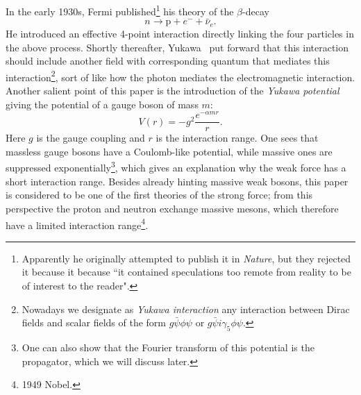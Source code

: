 In the early 1930s, Fermi published\footnote{Apparently he originally attempted
to publish it in {\it Nature}, but they rejected it because
it because ``it contained speculations too remote from reality to be of interest
to the reader".} his theory of the 
$\beta$-decay~\cite{fermi_tentativo_1934}
\begin{equation}
  n\to\text{p}+e^-+\bar{\nu}_e.
\end{equation}
He introduced an effective 4-point interaction directly linking the four
particles in the above process.
Shortly thereafter, Yukawa~\cite{yukawa_interaction_1935} put forward that this
interaction should include another field with corresponding quantum that
mediates this interaction\footnote{Nowadays we designate as
{\it Yukawa interaction} any interaction between
Dirac fields and scalar fields of the form
$g\bar{\psi}\phi\psi$ or $g\bar{\psi}i\gamma_5\phi\psi$.}, 
sort of like how the photon mediates the
electromagnetic interaction. Another salient point of this paper is
the introduction of the {\it Yukawa potential}
giving the potential of a gauge boson of mass $m$:
\begin{equation}
  V(r)=-g^2\frac{e^{-\alpha m r}}{r}.
\end{equation}
Here $g$ is the gauge coupling and $r$ is the interaction range. One sees that
massless gauge bosons have a Coulomb-like potential, while massive ones
are suppressed exponentially\footnote{One can also show that the Fourier
transform of this potential is the propagator, which we will discuss later.},
which gives an explanation why the weak force has a short interaction range. 
Besides already hinting massive weak bosons, this paper is considered to be
one of the first theories of the strong force; from this perspective the
proton and neutron exchange massive mesons, which therefore have a limited
interaction range\footnote{1949 Nobel.}.

